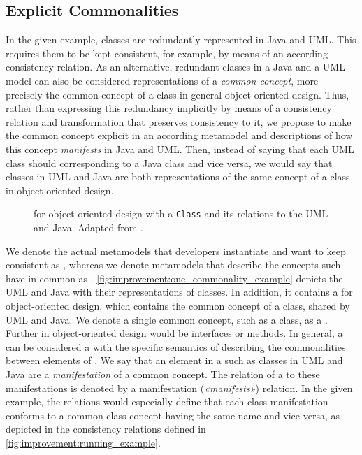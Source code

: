 \subsection{Explicit Commonalities}
\label{chap:improvement:concepts:explicit}

In the given example, classes are redundantly represented in Java and \gls{UML}.
This requires them to be kept consistent, for example, by means of an according consistency relation.
As an alternative, redundant classes in a Java and a \gls{UML} model can also be considered representations of a \emph{common concept}, more precisely the common concept of a class in general object-oriented design.
Thus, rather than expressing this redundancy implicitly by means of a consistency relation and transformation that preserves consistency to it, we propose to make the common concept explicit in an according metamodel and descriptions of how this concept \emph{manifests} in Java and \gls{UML}.
Then, instead of saying that each \gls{UML} class should corresponding to a Java class and vice versa, we would say that classes in \gls{UML} and Java are both representations of the same concept of a class in object-oriented design.

\begin{figure}
    \centering
    
    \caption[One \commonality example for object-oriented design]{\Conceptmetamodel for object-oriented design with a \texttt{Class} \commonality and its relations to the \concretemetamodels \gls{UML} and Java. Adapted from .}
    \label{fig:improvement:one_commonality_example}
\end{figure}

We denote the actual metamodels that developers instantiate and want to keep consistent as \emph{\concretemetamodels}, whereas we denote metamodels that describe the concepts such \concretemetamodels have in common as \emph{\conceptmetamodels}.
\autoref{fig:improvement:one_commonality_example} depicts the \concretemetamodels \gls{UML} and Java with their representations of classes.
In addition, it contains a \conceptmetamodel for object-oriented design, which contains the common concept of a class, shared by \gls{UML} and Java.
We denote a single common concept, such as a class, as a \emph{\commonality}.
Further \commonalities in object-oriented design would be interfaces or methods.
In general, a \commonality can be considered a \metaclass with the specific semantics of describing the commonalities between elements of \concretemetamodels.
We say that an element in a \concretemetamodel such as classes in \gls{UML} and Java are a \emph{manifestation} of a common concept.
The relation of a \commonality to these manifestations is denoted by a manifestation (\emph{«manifests»}) relation.
In the given example, the relations would especially define that each class manifestation conforms to a common class concept having the same name and vice versa, as depicted in the consistency relations defined in \autoref{fig:improvement:running_example}.

